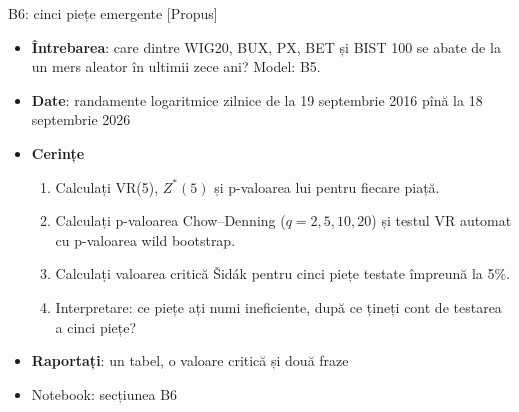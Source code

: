 \begin{frame}{B6: cinci piețe emergente [Propus]}
\itemsize{\footnotesize}
\begin{itemize}
\item \textbf{Întrebarea}: care dintre WIG20, BUX, PX, BET și BIST 100 se abate de la un mers aleator în ultimii zece ani? Model: B5.
\item \textbf{Date}: randamente logaritmice zilnice de la 19 septembrie 2016 pînă la 18 septembrie 2026
\item \textbf{Cerințe}
\begin{enumerate}
    \item Calculați VR(5), $Z^*(5)$ și p-valoarea lui pentru fiecare piață.
    \item Calculați p-valoarea Chow--Denning ($q = 2, 5, 10, 20$) și testul VR automat cu p-valoarea wild bootstrap.
    \item Calculați valoarea critică Šidák pentru cinci piețe testate împreună la 5\%.
    \item Interpretare: ce piețe ați numi ineficiente, după ce țineți cont de testarea a cinci piețe?
\end{enumerate}
\item \textbf{Raportați}: un tabel, o valoare critică și două fraze
\item Notebook: secțiunea B6
\end{itemize}
\end{frame}

